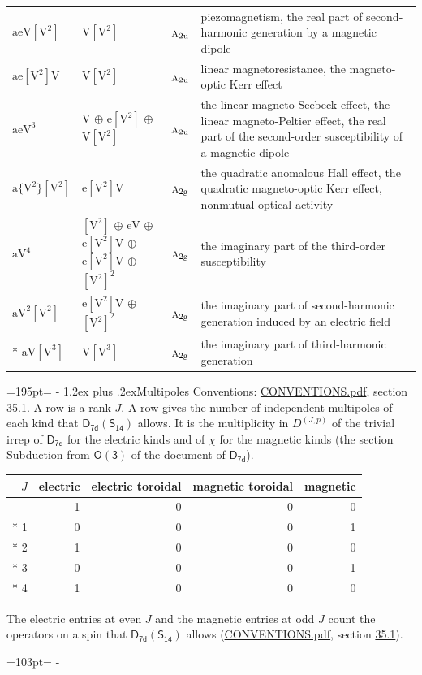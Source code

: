 \documentclass[10pt,a4paper]{article}
\makeatletter
\renewcommand\section{\@startsection{section}{1}{\z@}{-3ex plus -1ex minus -.2ex}%
  {1.2ex plus .2ex}{\normalfont\large\sffamily\bfseries\color{parttitle}}}
\newcommand{\needspace}[1]{\par\penalty-100\begingroup\dimen0=#1\relax\dimen2=\pagegoal
  \advance\dimen2-\pagetotal\ifdim\dimen0>\dimen2\relax\ifdim\dimen2>0pt\vfil\break\fi\fi
  \endgroup}
\numberwithin{equation}{section}
\newcommand{\grp}[1]{\mathsf{#1}}
\newcommand{\irr}[1]{\text{\normalfont\scshape #1}}
\newcommand{\ptag}[1]{\mathrm{#1}}
\newcommand{\irrJp}[2]{D^{(#1,#2)}}
\newcommand{\jahn}[1]{\mathrm{#1}}
\newlength{\fillwidth}\newlength{\cellwidth}\newlength{\colwidth}
\makeatother
\begin{document}
{\begin{longtable}{@{}lll>{\RaggedRight\arraybackslash}p{\fillwidth}@{}}
$\jahn{aeV[V^{2}]}$ & $\jahn{V[V^{2}]}$ & $\irr{a}_{2\ptag{u}}$ & piezomagnetism, the real part of second-harmonic generation by a magnetic dipole\\
$\jahn{ae[V^{2}]V}$ & $\jahn{V[V^{2}]}$ & $\irr{a}_{2\ptag{u}}$ & linear magnetoresistance, the magneto-optic Kerr effect\\
$\jahn{aeV^{3}}$ & $\jahn{V}$ $\oplus$ $\jahn{e[V^{2}]}$ $\oplus$ $\jahn{V[V^{2}]}$ & $\irr{a}_{2\ptag{u}}$ & the linear magneto-Seebeck effect, the linear magneto-Peltier effect, the real part of the second-order susceptibility of a magnetic dipole\\
$\jahn{a\{V^{2}\}[V^{2}]}$ & $\jahn{e[V^{2}]V}$ & $\irr{a}_{2\ptag{g}}$ & the quadratic anomalous Hall effect, the quadratic magneto-optic Kerr effect, nonmutual optical activity\\
$\jahn{aV^{4}}$ & $\jahn{[V^{2}]}$ $\oplus$ $\jahn{eV}$ $\oplus$ $\jahn{e[V^{2}]V}$ $\oplus$ $\jahn{e[V^{2}]V}$ $\oplus$ $\jahn{[V^{2}]^{2}}$ & $\irr{a}_{2\ptag{g}}$ & the imaginary part of the third-order susceptibility\\
$\jahn{aV^{2}[V^{2}]}$ & $\jahn{e[V^{2}]V}$ $\oplus$ $\jahn{[V^{2}]^{2}}$ & $\irr{a}_{2\ptag{g}}$ & the imaginary part of second-harmonic generation induced by an electric field\\*
$\jahn{aV[V^{3}]}$ & $\jahn{V[V^{3}]}$ & $\irr{a}_{2\ptag{g}}$ & the imaginary part of third-harmonic generation\\
\bottomrule\end{longtable}}
\needspace{195pt}
\section{Multipoles}\label{s:multipoles}
Conventions: \href{../../CONVENTIONS.pdf}{CONVENTIONS.pdf}, section \href{../../CONVENTIONS.pdf\#conv.35.1}{35.1}.
A row is a rank $J$. \label{n:head.multipole.electric}\label{n:head.multipole.electric.toroidal}\label{n:head.multipole.magnetic.toroidal}\label{n:head.multipole.magnetic}A row gives the number of independent multipoles of each kind that $\grp{D_{7d}}(\grp{S_{14}})$ allows. It is the multiplicity in $\irrJp{J}{p}$ of the trivial irrep of $\grp{D_{7d}}$ for the electric kinds and of $\chi$ for the magnetic kinds (the section Subduction from $\grp{O(3)}$ of the document of \href{../../../rotation/data/pdf/D7d.pdf}{$\grp{D_{7d}}$}).
{\small\begin{longtable}{@{}rrrrr@{}}\toprule
$J$ & electric & electric toroidal & magnetic toroidal & magnetic\\\midrule\endhead
\bottomrule\endfoot\endlastfoot
0 & 1 & 0 & 0 & 0\\*
1 & 0 & 0 & 0 & 1\\*
2 & 1 & 0 & 0 & 0\\*
3 & 0 & 0 & 0 & 1\\*
4 & 1 & 0 & 0 & 0\\
\bottomrule\end{longtable}}
The electric entries at even $J$ and the magnetic entries at odd $J$ count the operators on a spin that $\grp{D_{7d}}(\grp{S_{14}})$ allows (\href{../../CONVENTIONS.pdf}{CONVENTIONS.pdf}, section \href{../../CONVENTIONS.pdf\#conv.35.1}{35.1}).
\needspace{103pt}
\end{document}
